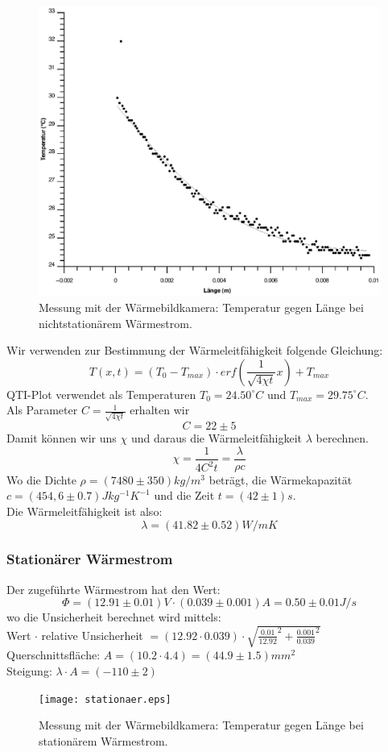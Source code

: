 \documentclass[12pt,a4paper,twopage]{article}
\begin{document}
\begin{figure}[H]
\centering
\includegraphics[scale=0.8]{nichtstationaer.eps}
\caption{Messung mit der Wärmebildkamera: Temperatur gegen Länge bei nichtstationärem Wärmestrom.}
\end{figure}

Wir verwenden zur Bestimmung der Wärmeleitfähigkeit folgende Gleichung:
$$T(x,t)=(T_0 - T_{max}) \cdot erf\left(\frac{1}{\sqrt{4\chi t}}x\right) + T_{max}$$
QTI-Plot verwendet als Temperaturen $T_0=24.50^\circ C$ und $T_{max}=29.75^\circ C$.\\
Als Parameter $C=\frac{1}{\sqrt{4\chi t}}$ erhalten wir
$$C=22 \pm 5$$
Damit können wir uns $\chi$ und daraus die Wärmeleitfähigkeit $\lambda$ berechnen.
$$\chi = \frac{1}{4C^2 t}=\frac{\lambda}{\rho c}$$
Wo die Dichte $\rho = (7480 \pm 350)kg/m^3$ beträgt, die Wärmekapazität $c=(454,6 \pm 0.7)Jkg^{-1}K^{-1}$ und die Zeit $t=(42 \pm 1)s$.\\
Die Wärmeleitfähigkeit ist also:
$$\boxed{\lambda = (41.82 \pm 0.52)W/m K}$$
\subsubsection{Stationärer Wärmestrom}
Der zugeführte Wärmestrom hat den Wert:
$$\Phi=(12.91 \pm 0.01)V \cdot (0.039 \pm 0.001)A=0.50 \pm 0.01 J/s$$
wo die Unsicherheit berechnet wird mittels:\\
Wert $\cdot$ relative Unsicherheit $= (12.92 \cdot 0.039) \cdot \sqrt{\frac{0.01}{12.92}^2 + \frac{0.001}{0.039}^2}$\\
Querschnittsfläche: $A=(10.2 \cdot 4.4)=(44.9 \pm 1.5)mm^2$\\
Steigung: $\lambda \cdot A = (-110 \pm 2)$\\
\begin{figure}[H]
\centering
\texttt{[image: stationaer.eps]}
\caption{Messung mit der Wärmebildkamera: Temperatur gegen Länge bei stationärem Wärmestrom.}
\end{figure}
\end{document}

